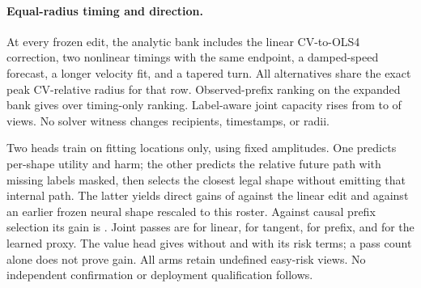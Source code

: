 \paragraph{Equal-radius timing and direction.}
At every frozen edit, the analytic bank includes the linear CV-to-OLS4
correction, two nonlinear timings with the same endpoint, a damped-speed
forecast, a longer velocity fit, and a tapered turn. All alternatives
share the exact peak CV-relative radius for that row. Observed-prefix
ranking on the expanded bank gives \RadiusShapeTimingEffect{} over
timing-only ranking. Label-aware joint capacity rises from
\RadiusShapeTiming{} to \RadiusShapeFull{} of \RadiusShapeViews{} views.
No solver witness changes recipients, timestamps, or radii.

Two heads train on fitting locations only, using fixed amplitudes. One
predicts per-shape utility and harm; the other predicts the relative
future path with missing labels masked, then selects the closest legal
shape without emitting that internal path. The latter yields direct
gains of \RadiusShapeLinear{} against the linear edit and
\RadiusShapeTangent{} against an earlier frozen neural shape rescaled
to this roster. Against causal prefix selection its gain is
\RadiusShapePrefix{}. Joint passes are \RadiusShapeLinearPass{} for
linear, \RadiusShapeTangentPass{} for tangent, \RadiusShapePrefixPass{}
for prefix, and \RadiusShapeDynPass{} for the learned proxy. The
value head gives \RadiusShapeValuePass{} without and \RadiusShapeValueRiskPass{}
with its risk terms; a pass count alone does not prove gain. All arms
retain \RadiusShapeUndefined{} undefined easy-risk views. No independent
confirmation or deployment qualification follows.
